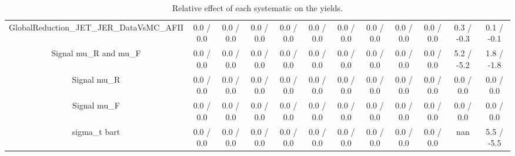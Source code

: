 \begin{table}[htbp]
\begin{center}
\begin{tabular}{|c|c|c|c|c|c|c|c|c|c|c|c|}
  GlobalReduction_JET_JER_DataVsMC_AFII & 0.0 / 0.0 & 0.0 / 0.0 & 0.0 / 0.0 & 0.0 / 0.0 & 0.0 / 0.0 & 0.0 / 0.0 & 0.0 / 0.0 & 0.0 / 0.0 & 0.0 / 0.0 & 0.3 / -0.3 & 0.1 / -0.1 \\ 
  Signal  mu_{R} and  mu_{F} & 0.0 / 0.0 & 0.0 / 0.0 & 0.0 / 0.0 & 0.0 / 0.0 & 0.0 / 0.0 & 0.0 / 0.0 & 0.0 / 0.0 & 0.0 / 0.0 & 0.0 / 0.0 & 5.2 / -5.2 & 1.8 / -1.8 \\ 
  Signal  mu_{R} & 0.0 / 0.0 & 0.0 / 0.0 & 0.0 / 0.0 & 0.0 / 0.0 & 0.0 / 0.0 & 0.0 / 0.0 & 0.0 / 0.0 & 0.0 / 0.0 & 0.0 / 0.0 & 0.0 / 0.0 & 0.0 / 0.0 \\ 
  Signal  mu_{F} & 0.0 / 0.0 & 0.0 / 0.0 & 0.0 / 0.0 & 0.0 / 0.0 & 0.0 / 0.0 & 0.0 / 0.0 & 0.0 / 0.0 & 0.0 / 0.0 & 0.0 / 0.0 & 0.0 / 0.0 & 0.0 / 0.0 \\ 
   sigma_{t bar{t}} & 0.0 / 0.0 & 0.0 / 0.0 & 0.0 / 0.0 & 0.0 / 0.0 & 0.0 / 0.0 & 0.0 / 0.0 & 0.0 / 0.0 & 0.0 / 0.0 & 0.0 / 0.0 &    nan    & 5.5 / -5.5 \\ 
\hline 
\end{tabular} 
\caption{Relative effect of each systematic on the yields.} 
\end{center} 
\end{table} 

